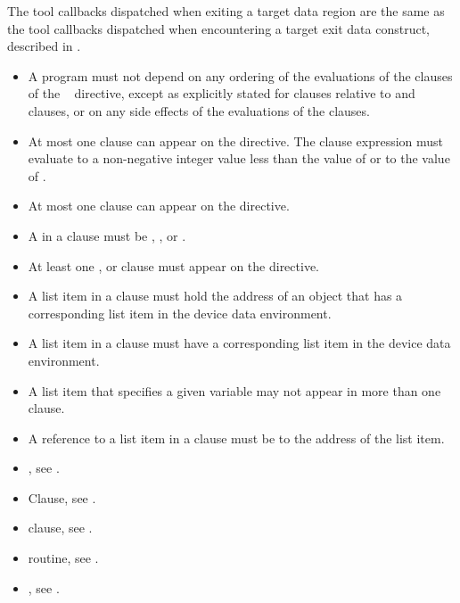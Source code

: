 The tool callbacks dispatched when exiting a target data region are
the same as the tool callbacks dispatched when encountering
a target exit data construct, described in
.

\restrictions
\begin{itemize}
\item A program must not depend on any ordering of the evaluations of the
      clauses of the ~ directive, except as explicitly
      stated for  clauses relative to  and
       clauses, or on any side effects of the evaluations 
      of the clauses.
\item At most one  clause can appear on the directive. The
       clause expression  must evaluate to a non-negative integer
      value less than the value of  or to the value of
      .
\item At most one  clause can appear on the directive.
\item A  in a  clause must be , , 
       or .
\item At least one ,  or 
      clause must appear on the directive.
\item A list item in a  clause must hold the address of
      an object that has a corresponding list item in the device data environment.
\item A list item in a  clause must have a
      corresponding list item in the device data environment.
\item A list item that specifies a given variable may not appear in more than
      one  clause.
\item A reference to a list item in a  clause must be to
      the address of the list item.
\end{itemize}


\crossreferences
\begin{itemize}
\item {}, see
.

\item {} Clause, see .

\item {} clause, see
.

\item {} routine, see .

\item {}, see
.

\end{itemize}



